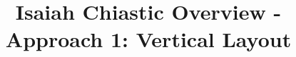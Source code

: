 \documentclass[11pt]{article}
\begin{document}
\title{Isaiah Chiastic Overview - Approach 1: Vertical Layout}
\date{}
\maketitle


\vspace{2cm}

\end{document}
